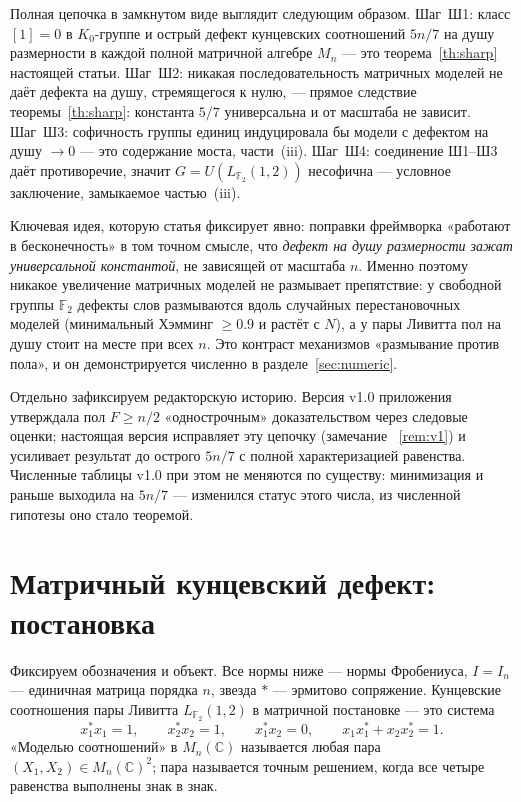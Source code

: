 \documentclass[11pt,a4paper]{article}
\theoremstyle{plain}
\theoremstyle{definition}
\theoremstyle{remark}
\begin{document}
Полная цепочка в замкнутом виде выглядит следующим образом. Шаг~Ш1:
класс $[1]=0$ в $K_0$-группе и острый дефект кунцевских соотношений
$5n/7$ на душу размерности в каждой полной матричной алгебре $M_n$ —
это теорема~\ref{th:sharp} настоящей статьи. Шаг~Ш2: никакая
последовательность матричных моделей не даёт дефекта на душу, стремящегося
к нулю, — прямое следствие теоремы~\ref{th:sharp}: константа $5/7$
универсальна и от масштаба не зависит. Шаг~Ш3: софичность группы единиц
индуцировала бы модели с дефектом на душу $\to 0$ — это содержание моста,
части~(iii). Шаг~Ш4: соединение Ш1--Ш3 даёт противоречие, значит
$G=U(L_{\mathbb{F}_2}(1,2))$ несофична — условное заключение,
замыкаемое частью~(iii).

Ключевая идея, которую статья фиксирует явно: поправки фреймворка
«работают в бесконечность» в том точном смысле, что \emph{дефект на душу
размерности зажат универсальной константой}, не зависящей от масштаба
$n$. Именно поэтому никакое увеличение матричных моделей не размывает
препятствие: у свободной группы $\mathbb{F}_2$ дефекты слов размываются
вдоль случайных перестановочных моделей (минимальный Хэмминг
$\ge 0.9$ и растёт с $N$), а у пары Ливитта пол на душу стоит на месте
при всех $n$. Это контраст механизмов «размывание против пола», и он
демонстрируется численно в разделе~\ref{sec:numeric}.

Отдельно зафиксируем редакторскую историю. Версия v1.0 приложения
утверждала пол $F\ge n/2$ «однострочным» доказательством через следовые
оценки; настоящая версия исправляет эту цепочку (замечание
~\ref{rem:v1}) и усиливает результат до острого $5n/7$ с полной
характеризацией равенства. Численные таблицы v1.0 при этом не меняются
по существу: минимизация и раньше выходила на $5n/7$ — изменился статус
этого числа, из численной гипотезы оно стало теоремой.

\section{Матричный кунцевский дефект: постановка}\label{sec:setup}

Фиксируем обозначения и объект. Все нормы ниже — нормы Фробениуса,
$I=I_n$ — единичная матрица порядка $n$, звезда $*$ — эрмитово
сопряжение. Кунцевские соотношения пары Ливитта
$L_{\mathbb{F}_2}(1,2)$ в матричной постановке — это система
\begin{equation}
x_1^*x_1 = 1,\qquad x_2^*x_2 = 1,\qquad x_1^*x_2 = 0,\qquad
x_1x_1^* + x_2x_2^* = 1.
\label{eq:kunze}
\end{equation}
«Моделью соотношений» в $M_n(\mathbb{C})$ называется любая пара
$(X_1,X_2)\in M_n(\mathbb{C})^2$; пара называется точным решением, когда
все четыре равенства выполнены знак в знак.
\end{document}
